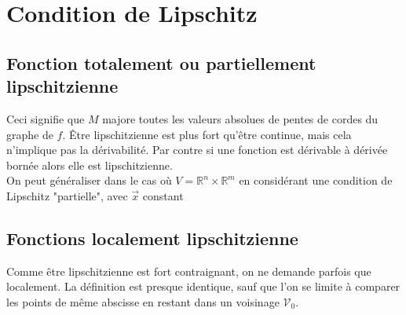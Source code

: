 \setcounter{section}{4}
\section{Condition de Lipschitz}
\subsection{Fonction totalement ou partiellement lipschitzienne}
Ceci signifie que $M$ majore toutes les valeurs absolues de pentes de cordes 
du graphe de $f$. Être lipschitzienne est plus fort qu'être continue, mais 
cela n'implique pas la dérivabilité. Par contre si une fonction est dérivable 
à dérivée bornée alors elle est lipschitzienne.\\
	
On peut généraliser dans le cas où $V = \mathbb{R}^n\times\mathbb{R}^m$ en 
considérant une condition de Lipschitz "partielle", avec $\vec{x}$ constant 

	
	
\newpage
\subsection{Fonctions localement lipschitzienne}
Comme être lipschitzienne est fort contraignant, on ne demande parfois que 
localement. La définition est presque identique, sauf que l'on se limite à 
comparer les points de même abscisse en restant dans un voisinage $\mathcal{V}_0$.
	
	
